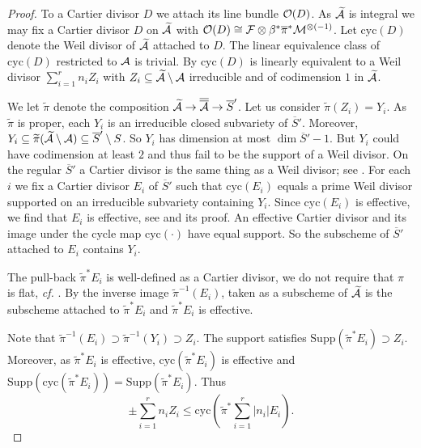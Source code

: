 \begin{proof}
To a Cartier divisor $D$ we attach its line bundle ${\mathcal O}(D)$.
As $\widetilde {\mathcal{A}}$ is integral we may fix a Cartier divisor $D$ on
$\widetilde {\mathcal{A}}$ with ${\mathcal O}(D) \cong {\mathcal F}\otimes \beta^*\overline\pi^*
{\mathcal M}^{\otimes(-1)}$. Let $\mathrm{cyc}(D)$ denote the Weil divisor of $\widetilde{\mathcal{A}}$
attached to $D$. The linear equivalence class of $\mathrm{cyc}(D)$
restricted to $\mathcal{A}$ is trivial. By \cite[Proposition~11.40]{GoertzWedhorn}
$\mathrm{cyc}(D)$ is linearly equivalent to a Weil divisor $\sum_{i=1}^r n_i
Z_i$ with  $Z_i \subseteq\widetilde{\mathcal{A}}\setminus \mathcal{A}$ irreducible and of
codimension $1$ in $\widetilde{\mathcal{A}}$. 

We let $\widetilde\pi$ denote the composition
$\widetilde{\mathcal{A}}\rightarrow \overline{\overline{\mathcal{A}}}\rightarrow \overline{S}'$. 
Let us consider $\widetilde\pi(Z_i) = Y_i$. As $\widetilde\pi$ is proper, each $Y_i$ is
an irreducible closed subvariety of $\overline S'$. Moreover, $Y_i
\subseteq \widetilde\pi(\widetilde{\mathcal{A}}\setminus \mathcal{A}) \subseteq \overline S'\setminus S$. So $Y_i$ has
dimension at most $\dim \overline S' - 1$. But $Y_i$ could have
codimension at least $2$ and thus fail to be the support of a Weil divisor.
On the regular $\overline S'$ a 
Cartier divisor is the same thing as a Weil divisor;
see \cite[Theorem~11.38(2)]{GoertzWedhorn}.
For each $i$ we fix a Cartier divisor  $E_i$ of $\overline S'$
such that   $\mathrm{cyc}(E_i)$ equals a prime Weil divisor supported on an irreducible
subvariety containing $Y_i$.
 Since $\mathrm{cyc}(E_i)$ is effective, we find that $E_i$ is effective, see \cite[Theorem~11.38(1)]{GoertzWedhorn}
 and its proof. 
An effective Cartier divisor and its image under the cycle map
$\mathrm{cyc}(\cdot)$ have equal support. So the subscheme of $\overline S'$ attached to  $E_i$
contains $Y_i$. 

The pull-back $\widetilde\pi^*E_i$ is well-defined as a Cartier
divisor, we do not require that $\pi$ is flat, \textit{cf.}
\cite[Proposition~11.48(b)]{GoertzWedhorn}. 
By \cite[Corollary~11.49]{GoertzWedhorn} the inverse image
$\widetilde\pi^{-1}(E_i)$, taken as  a subscheme of $\widetilde{\mathcal{A}}$
is the subscheme attached to  $\widetilde\pi^*E_i$ and $\widetilde\pi^*E_i$ is
effective. 

Note that $\widetilde\pi^{-1}(E_i)\supset \widetilde\pi^{-1}(Y_i)\supset Z_i$. 
The support satisfies $\mathrm{Supp}(\widetilde\pi^* E_i)\supset Z_i$.
Moreover, as $\widetilde\pi^*E_i$ is effective,  $\mathrm{cyc}(\widetilde\pi^* E_i)$ is effective and
 $\mathrm{Supp} (\mathrm{cyc}(\widetilde\pi^* E_i)) =
\mathrm{Supp}(\widetilde\pi^*E_i)$.
Thus
\begin{equation*}
\pm   \sum_{i=1}^r n_i Z_i \le \mathrm{cyc}\left(\widetilde\pi^*\sum_{i=1}^r |n_i|
  E_i\right).
\end{equation*}


\end{proof}
